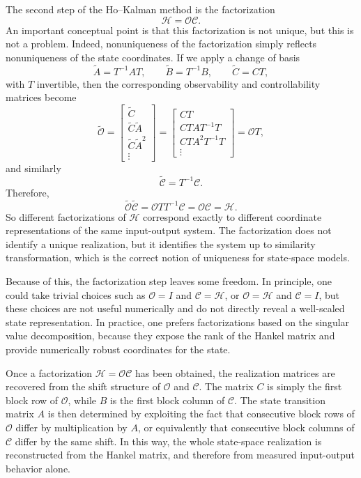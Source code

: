 The second step of the Ho--Kalman method is the factorization
\[
\mathcal{H}=\mathcal{O}\mathcal{C}.
\]
An important conceptual point is that this factorization is not unique, but this is not a problem. Indeed, nonuniqueness of the factorization simply reflects nonuniqueness of the state coordinates. If we apply a change of basis
\[
\tilde A = T^{-1}AT,\qquad \tilde B = T^{-1}B,\qquad \tilde C = CT,
\]
with \(T\) invertible, then the corresponding observability and controllability matrices become
\[
\tilde{\mathcal{O}}=
\begin{bmatrix}
\tilde C\\
\tilde C\tilde A\\
\tilde C\tilde A^2\\
\vdots
\end{bmatrix}
=
\begin{bmatrix}
CT\\
CTA T^{-1}T\\
CTA^2T^{-1}T\\
\vdots
\end{bmatrix}
=
\mathcal{O}T,
\]
and similarly
\[
\tilde{\mathcal{C}}=T^{-1}\mathcal{C}.
\]
Therefore,
\[
\tilde{\mathcal{O}}\tilde{\mathcal{C}}
=
\mathcal{O}TT^{-1}\mathcal{C}
=
\mathcal{O}\mathcal{C}
=
\mathcal{H}.
\]
So different factorizations of \(\mathcal{H}\) correspond exactly to different coordinate representations of the same input-output system. The factorization does not identify a unique realization, but it identifies the system up to similarity transformation, which is the correct notion of uniqueness for state-space models.

Because of this, the factorization step leaves some freedom. In principle, one could take trivial choices such as \(\mathcal{O}=I\) and \(\mathcal{C}=\mathcal{H}\), or \(\mathcal{O}=\mathcal{H}\) and \(\mathcal{C}=I\), but these choices are not useful numerically and do not directly reveal a well-scaled state representation. In practice, one prefers factorizations based on the singular value decomposition, because they expose the rank of the Hankel matrix and provide numerically robust coordinates for the state.

Once a factorization \(\mathcal{H}=\mathcal{O}\mathcal{C}\) has been obtained, the realization matrices are recovered from the shift structure of \(\mathcal{O}\) and \(\mathcal{C}\). The matrix \(C\) is simply the first block row of \(\mathcal{O}\), while \(B\) is the first block column of \(\mathcal{C}\). The state transition matrix \(A\) is then determined by exploiting the fact that consecutive block rows of \(\mathcal{O}\) differ by multiplication by \(A\), or equivalently that consecutive block columns of \(\mathcal{C}\) differ by the same shift. In this way, the whole state-space realization is reconstructed from the Hankel matrix, and therefore from measured input-output behavior alone.

